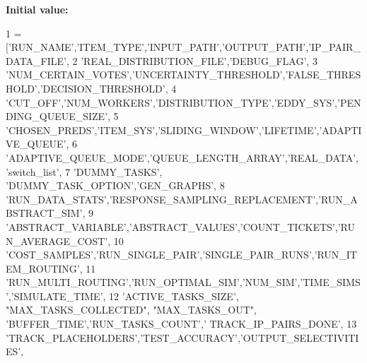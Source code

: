 {\bfseries Initial value\+:}
\begin{DoxyCode}
1 =   [\textcolor{stringliteral}{'RUN\_NAME'},\textcolor{stringliteral}{'ITEM\_TYPE'},\textcolor{stringliteral}{'INPUT\_PATH'},\textcolor{stringliteral}{'OUTPUT\_PATH'},\textcolor{stringliteral}{'IP\_PAIR\_DATA\_FILE'},
2             \textcolor{stringliteral}{'REAL\_DISTRIBUTION\_FILE'},\textcolor{stringliteral}{'DEBUG\_FLAG'},
3             \textcolor{stringliteral}{'NUM\_CERTAIN\_VOTES'},\textcolor{stringliteral}{'UNCERTAINTY\_THRESHOLD'},\textcolor{stringliteral}{'FALSE\_THRESHOLD'},\textcolor{stringliteral}{'DECISION\_THRESHOLD'},
4             \textcolor{stringliteral}{'CUT\_OFF'},\textcolor{stringliteral}{'NUM\_WORKERS'},\textcolor{stringliteral}{'DISTRIBUTION\_TYPE'},\textcolor{stringliteral}{'EDDY\_SYS'},\textcolor{stringliteral}{'PENDING\_QUEUE\_SIZE'},
5             \textcolor{stringliteral}{'CHOSEN\_PREDS'},\textcolor{stringliteral}{'ITEM\_SYS'},\textcolor{stringliteral}{'SLIDING\_WINDOW'},\textcolor{stringliteral}{'LIFETIME'},\textcolor{stringliteral}{'ADAPTIVE\_QUEUE'},
6             \textcolor{stringliteral}{'ADAPTIVE\_QUEUE\_MODE'},\textcolor{stringliteral}{'QUEUE\_LENGTH\_ARRAY'},\textcolor{stringliteral}{'REAL\_DATA'}, \textcolor{stringliteral}{'switch\_list'},
7             \textcolor{stringliteral}{'DUMMY\_TASKS'}, \textcolor{stringliteral}{'DUMMY\_TASK\_OPTION'},\textcolor{stringliteral}{'GEN\_GRAPHS'},
8             \textcolor{stringliteral}{'RUN\_DATA\_STATS'},\textcolor{stringliteral}{'RESPONSE\_SAMPLING\_REPLACEMENT'},\textcolor{stringliteral}{'RUN\_ABSTRACT\_SIM'},
9             \textcolor{stringliteral}{'ABSTRACT\_VARIABLE'},\textcolor{stringliteral}{'ABSTRACT\_VALUES'},\textcolor{stringliteral}{'COUNT\_TICKETS'},\textcolor{stringliteral}{'RUN\_AVERAGE\_COST'},
10             \textcolor{stringliteral}{'COST\_SAMPLES'},\textcolor{stringliteral}{'RUN\_SINGLE\_PAIR'},\textcolor{stringliteral}{'SINGLE\_PAIR\_RUNS'},\textcolor{stringliteral}{'RUN\_ITEM\_ROUTING'},
11             \textcolor{stringliteral}{'RUN\_MULTI\_ROUTING'},\textcolor{stringliteral}{'RUN\_OPTIMAL\_SIM'},\textcolor{stringliteral}{'NUM\_SIM'},\textcolor{stringliteral}{'TIME\_SIMS'},\textcolor{stringliteral}{'SIMULATE\_TIME'},
12             \textcolor{stringliteral}{'ACTIVE\_TASKS\_SIZE'}, \textcolor{stringliteral}{"MAX\_TASKS\_COLLECTED"}, \textcolor{stringliteral}{"MAX\_TASKS\_OUT"}, \textcolor{stringliteral}{'BUFFER\_TIME'},\textcolor{stringliteral}{'RUN\_TASKS\_COUNT'},\textcolor{stringliteral}{'
      TRACK\_IP\_PAIRS\_DONE'},
13             \textcolor{stringliteral}{'TRACK\_PLACEHOLDERS'},\textcolor{stringliteral}{'TEST\_ACCURACY'},\textcolor{stringliteral}{'OUTPUT\_SELECTIVITIES'},

\end{DoxyCode}
